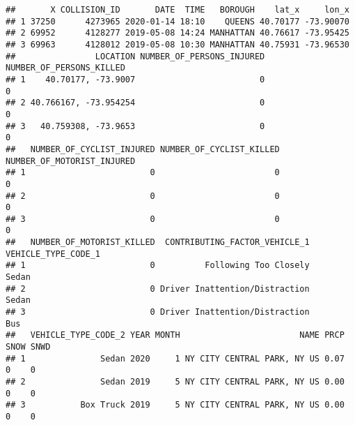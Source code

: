 \documentclass[
]{article}
\begin{document}
\begin{verbatim}
##       X COLLISION_ID       DATE  TIME   BOROUGH    lat_x     lon_x
## 1 37250      4273965 2020-01-14 18:10    QUEENS 40.70177 -73.90070
## 2 69952      4128277 2019-05-08 14:24 MANHATTAN 40.76617 -73.95425
## 3 69963      4128012 2019-05-08 10:30 MANHATTAN 40.75931 -73.96530
##                LOCATION NUMBER_OF_PERSONS_INJURED NUMBER_OF_PERSONS_KILLED
## 1    40.70177, -73.9007                         0                        0
## 2 40.766167, -73.954254                         0                        0
## 3   40.759308, -73.9653                         0                        0
##   NUMBER_OF_CYCLIST_INJURED NUMBER_OF_CYCLIST_KILLED NUMBER_OF_MOTORIST_INJURED
## 1                         0                        0                          0
## 2                         0                        0                          0
## 3                         0                        0                          0
##   NUMBER_OF_MOTORIST_KILLED  CONTRIBUTING_FACTOR_VEHICLE_1 VEHICLE_TYPE_CODE_1
## 1                         0          Following Too Closely               Sedan
## 2                         0 Driver Inattention/Distraction               Sedan
## 3                         0 Driver Inattention/Distraction                 Bus
##   VEHICLE_TYPE_CODE_2 YEAR MONTH                        NAME PRCP SNOW SNWD
## 1               Sedan 2020     1 NY CITY CENTRAL PARK, NY US 0.07    0    0
## 2               Sedan 2019     5 NY CITY CENTRAL PARK, NY US 0.00    0    0
## 3           Box Truck 2019     5 NY CITY CENTRAL PARK, NY US 0.00    0    0
\end{verbatim}
\end{document}
